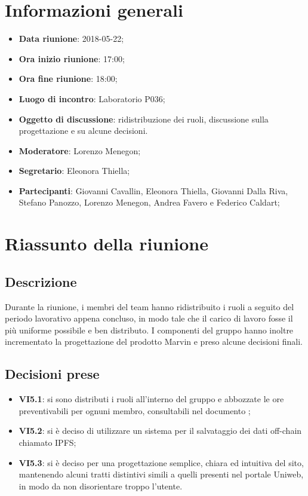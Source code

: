 \section{Informazioni generali}
	\begin{itemize}
		\item \textbf{Data riunione}: 2018-05-22;
		\item \textbf{Ora inizio riunione}: 17:00;
		\item \textbf{Ora fine riunione}: 18:00;
		\item \textbf{Luogo di incontro}: Laboratorio P036;
		\item \textbf{Oggetto di discussione}: ridistribuzione dei ruoli, discussione sulla progettazione e su alcune decisioni.
		\item \textbf{Moderatore}: Lorenzo Menegon;
		\item \textbf{Segretario}: Eleonora Thiella;
		\item \textbf{Partecipanti}: Giovanni Cavallin, Eleonora Thiella, Giovanni Dalla Riva, Stefano Panozzo, Lorenzo Menegon, Andrea Favero e Federico Caldart;
	\end{itemize}

\section{Riassunto della riunione}
	\subsection{Descrizione} Durante la riunione, i membri del team hanno ridistribuito i ruoli a seguito del periodo lavorativo appena concluso, in modo tale che il carico di lavoro fosse il più uniforme possibile e ben distributo. I componenti del gruppo hanno inoltre incrementato la progettazione del prodotto Marvin e preso alcune decisioni finali.
	
	\subsection{Decisioni prese}
		\begin{itemize}
			\item \textbf{VI5.1}: si sono distributi i ruoli all'interno del gruppo e abbozzate le ore preventivabili per ognuni membro, consultabili nel documento \PdP;
			\item \textbf{VI5.2}: si è deciso di utilizzare un sistema per il salvataggio dei dati off-chain chiamato IPFS;
			\item \textbf{VI5.3}: si è deciso per una progettazione semplice, chiara ed intuitiva del sito, mantenendo alcuni tratti distintivi simili a quelli presenti nel portale Uniweb, in modo da non disorientare troppo l'utente.
		\end{itemize}

